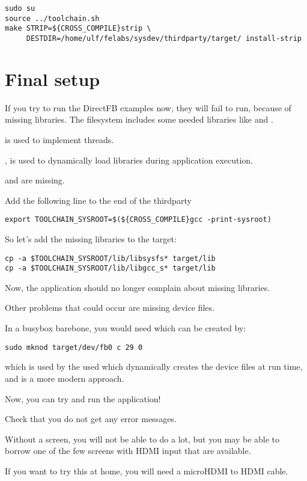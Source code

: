 \begin{verbatim}
sudo su
source ../toolchain.sh
make STRIP=${CROSS_COMPILE}strip \
     DESTDIR=/home/ulf/felabs/sysdev/thirdparty/target/ install-strip
\end{verbatim}

\section{Final setup}

If you try to run the DirectFB examples now, they will fail to run, 
because of missing libraries.
The  filesystem includes some needed libraries
like \code{libpthread} and \code{libdl}.

 is used to implement threads.

, is used to dynamically load libraries during
application execution. 

 and  are missing.

Add the following line to the end of the thirdparty 

\begin{verbatim}
export TOOLCHAIN_SYSROOT=$(${CROSS_COMPILE}gcc -print-sysroot)
\end{verbatim}

So let's add the missing libraries to the target:

\begin{verbatim}
cp -a $TOOLCHAIN_SYSROOT/lib/libsysfs* target/lib
cp -a $TOOLCHAIN_SYSROOT/lib/libgcc_s* target/lib
\end{verbatim}

Now, the application should no longer complain about missing
libraries. 

Other problems that could occur are missing device files.

In a busybox barebone, you would need 
which can be created by:

\begin{verbatim}
sudo mknod target/dev/fb0 c 29 0
\end{verbatim}

 which is used by the 
used  which dynamically creates the device files
at run time, and is a more modern approach.

Now, you can try and run the  application!

Check that you do not get any error messages.

Without a screen, you will not be able to do a lot,
but you may be able to borrow one of the few screens
with HDMI input that are available.

If you want to try this at home, you will need a microHDMI to HDMI cable.
